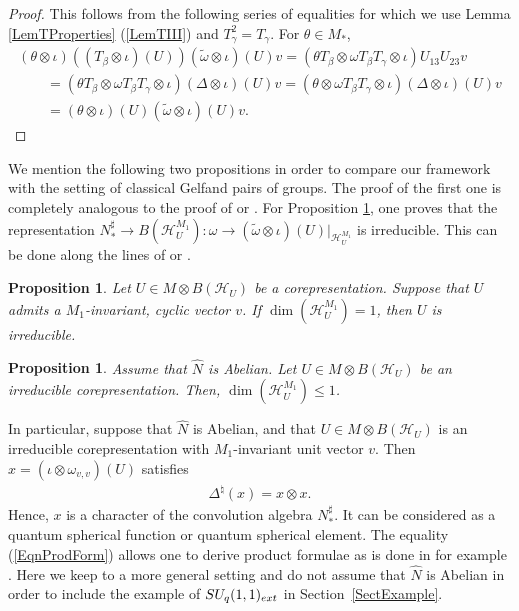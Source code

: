 \documentclass[11pt]{article}
\numberwithin{equation}{section}
\newtheorem{prop}[thm]{Proposition}
\theoremstyle{definition}
\newcommand{\cHil}{\mathcal{H}}
\begin{document}
\begin{proof}
 This follows from the following series of equalities for which we use Lemma \ref{LemTProperties} (\ref{LemTIII}) and $T_\gamma^2 = T_\gamma$. For $\theta \in M_\ast$,
 \begin{gather*}
  (\theta \otimes \iota)((T_\beta \otimes \iota)(U))(\tilde{\omega} \otimes \iota)(U)v = (\theta  T_\beta \otimes \omega  T_\beta T_\gamma \otimes \iota) U_{13} U_{23} v  \\
    \qquad{}
=   (\theta  T_\beta \otimes \omega T_\beta T_\gamma \otimes \iota) (\Delta \otimes \iota)(U) v
=
(\theta  \otimes \omega T_\beta T_\gamma \otimes \iota) (\Delta \otimes \iota)(U) v\\
\qquad{}
= (\theta \otimes \iota)(U) (\tilde{\omega} \otimes \iota)(U)v.\tag*{\qed}
 \end{gather*}
 \renewcommand{\qed}{}
\end{proof}



We mention the following two propositions in order to compare our framework with the setting of classical Gelfand pairs of groups. The proof of the f\/irst one is completely analogous to the proof of \cite[Proposition II.6]{Far} or \cite[Lemma 6.2.3]{Dij}. For Proposition \ref{PropAbDim}, one proves that the  representation $N_\ast^\sharp \rightarrow B(\cHil_U^{M_1}): \omega \rightarrow (\tilde{\omega} \otimes \iota)(U)\vert_{\cHil_U^{M_1}}$ is irreducible. This can be done along the lines of \cite[Th\'eor\`eme III.1]{Far} or \cite[Proposition 6.31]{Dij}.

\begin{prop}
 Let $U \in M \otimes B(\cHil_U)$ be a corepresentation. Suppose that $U$ admits a $M_1$-invariant, cyclic vector $v$. If $\dim(\cHil_U^{M_1}) = 1$, then $U$ is irreducible.
\end{prop}


\begin{prop}\label{PropAbDim}
Assume that $\hat{N}$ is Abelian. Let $U \in M \otimes B(\cHil_U)$ be an irreducible   corepresentation. Then, $\dim(\cHil_U^{M_1}) \leq 1$.
\end{prop}


In particular, suppose that  $\hat{N}$ is Abelian, and that $U \in M \otimes B(\cHil_U)$ is an irreducible corepresentation with $M_1$-invariant unit vector $v$. Then $x = (\iota \otimes \omega_{v,v})(U)$ satisf\/ies
\begin{gather}\label{EqnProdForm}
\Delta^\natural(x) = x \otimes x.
\end{gather}
Hence, $x$ is a character of the convolution algebra $N_\ast^\sharp$. It can be considered as a quantum spherical function or quantum spherical element. The equality (\ref{EqnProdForm}) allows one to derive product formulae as is done in for example \cite{VaiE2, VaiGel,VaiHyp}. Here we keep to a more general setting and do not assume that $\hat{N}$ is Abelian in order to include the example of $SU_q(1,1)_{{\rm ext}}$ in Section~\ref{SectExample}.
\end{document}
